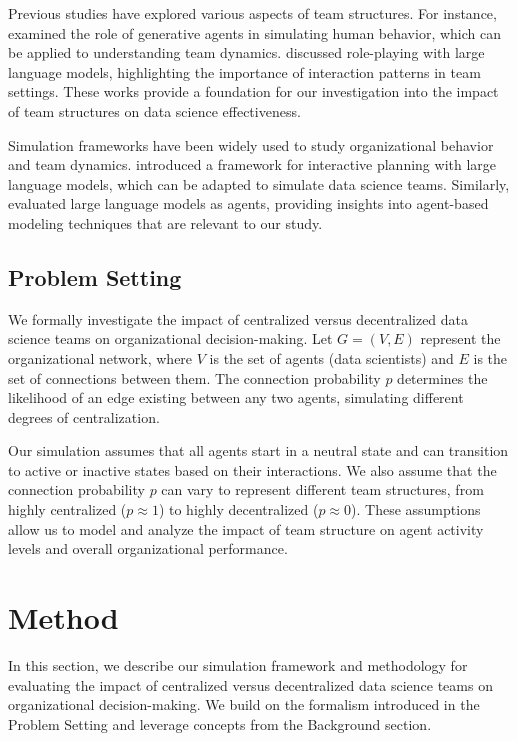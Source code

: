 \documentclass{article} %
\begin{document}
Previous studies have explored various aspects of team structures. For instance, \citet{park2023generative} examined the role of generative agents in simulating human behavior, which can be applied to understanding team dynamics. \citet{shanahan2023role} discussed role-playing with large language models, highlighting the importance of interaction patterns in team settings. These works provide a foundation for our investigation into the impact of team structures on data science effectiveness.

Simulation frameworks have been widely used to study organizational behavior and team dynamics. \citet{wang2023describe} introduced a framework for interactive planning with large language models, which can be adapted to simulate data science teams. Similarly, \citet{liu2023agentbench} evaluated large language models as agents, providing insights into agent-based modeling techniques that are relevant to our study.

\subsection{Problem Setting}
\label{sec:problem_setting}

We formally investigate the impact of centralized versus decentralized data science teams on organizational decision-making. Let \( G = (V, E) \) represent the organizational network, where \( V \) is the set of agents (data scientists) and \( E \) is the set of connections between them. The connection probability \( p \) determines the likelihood of an edge existing between any two agents, simulating different degrees of centralization.

Our simulation assumes that all agents start in a neutral state and can transition to active or inactive states based on their interactions. We also assume that the connection probability \( p \) can vary to represent different team structures, from highly centralized (\( p \approx 1 \)) to highly decentralized (\( p \approx 0 \)). These assumptions allow us to model and analyze the impact of team structure on agent activity levels and overall organizational performance.

\section{Method}
\label{sec:method}

In this section, we describe our simulation framework and methodology for evaluating the impact of centralized versus decentralized data science teams on organizational decision-making. We build on the formalism introduced in the Problem Setting and leverage concepts from the Background section.
\end{document}

